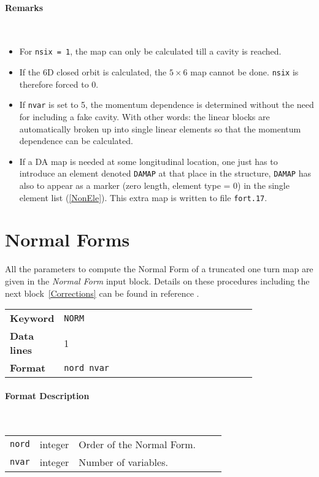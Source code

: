 \paragraph{Remarks}~
\begin{itemize}
    \item For \texttt{nsix = 1}, the map can only be calculated till a cavity is reached.
    \item If the 6D closed orbit is calculated, the $5 \times 6$ map cannot be done. \texttt{nsix} is therefore forced to 0.
    \item If \texttt{nvar} is set to 5, the momentum dependence is determined without the need for including a fake cavity. With other words: the linear blocks are automatically broken up into single linear elements so that the momentum dependence can be calculated.
    \item If a DA map is needed at some longitudinal location, one just has to introduce an element denoted \texttt{DAMAP} at that place in the structure, \texttt{DAMAP} has also to appear as a marker (zero length, element type = 0) in the single element list (\ref{NonEle}). This extra map is written to file \texttt{fort.17}.
\end{itemize}

\section{Normal Forms} \label{Normal}

All the parameters to compute the Normal Form of a truncated one turn map are given in the \textit{Normal Form} input block.
Details on these procedures including the next block~\ref{Corrections} can be found in reference \cite{Massimo}.

\bigskip
\begin{tabular}{@{}lp{0.8\linewidth}}
    \textbf{Keyword}    & \texttt{NORM} \\
    \textbf{Data lines} & 1 \\
    \textbf{Format}     & \texttt{nord nvar}
\end{tabular}

\paragraph{Format Description}~

\bigskip
\begin{tabular}{@{}llp{0.7\linewidth}}
    \texttt{nord} & integer & Order of the Normal Form. \\
    \texttt{nvar} & integer & Number of variables.
\end{tabular}

